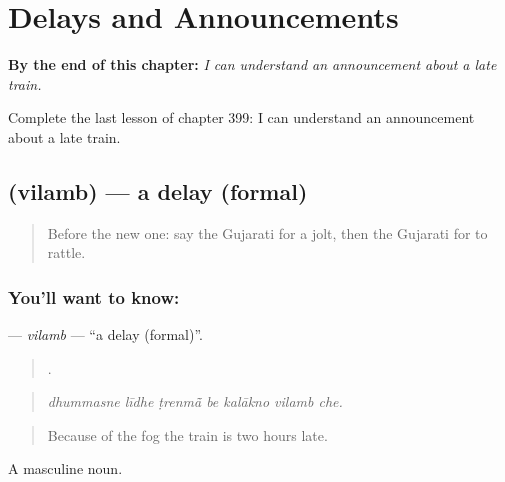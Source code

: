 
\chapter{Delays and Announcements}
\label{ch:gu-delays-and-announcements}

\begin{chapteropening}
\textbf{By the end of this chapter:} \emph{I can understand an announcement about a late train.}

Complete the last lesson of chapter 399: I can understand an announcement about a late train.
\end{chapteropening}

\section[\texorpdfstring{\gu{વિલંબ} (vilamb)}{વિલંબ (vilamb)}]{ (vilamb) — a delay (formal)}

\label{lesson:GU-C399-vilamb}



\begin{quote}
Before the new one: say the Gujarati for a jolt, then the Gujarati for to rattle.
\end{quote}

\subsection*{You'll want to know: }
\textbf{} — \emph{vilamb} — \textquotedblleft{}a delay (formal)\textquotedblright{}.

\begin{quote}
      .
\end{quote}

\begin{quote}
\emph{dhummasne līdhe ṭrenmā̃ be kalākno vilamb che.}
\end{quote}

\begin{quote}
Because of the fog the train is two hours late.
\end{quote}

A masculine noun.

